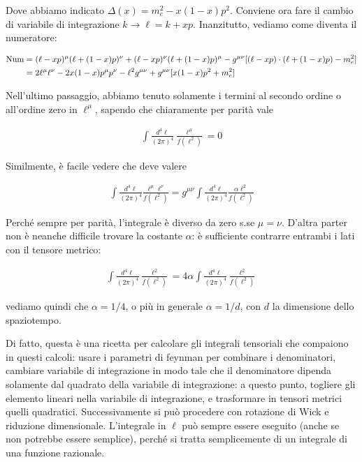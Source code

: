\documentclass[11pt]{report}
\begin{document}
Dove abbiamo indicato \(\Delta(x) = m_e^2 - x(1-x)p^2\). Conviene ora fare il cambio di variabile di integrazione \(k \to \ell = k+xp\). Inanzitutto, vediamo come diventa il numeratore: 

\begin{align}
    \text{Num} &= (\ell - xp)^\mu (\ell + (1-x)p)^\nu + (\ell - xp)^\nu (\ell + (1-x)p)^\mu -g^{\mu\nu}[(\ell-xp)\cdot(\ell + (1-x)p)-m_e^2] \notag \\
    &= 2\ell^\mu \ell^\nu - 2x(1-x)p^\mu p^\nu - \ell^2g^{\mu\nu} + g^{\mu\nu}[x(1-x)p^2 + m_e^2]
\end{align}

Nell'ultimo passaggio, abbiamo tenuto solamente i termini al secondo ordine o all'ordine zero in \(\ell^\mu\), sapendo che chiaramente per parità vale 

\begin{align}
    \int \frac{d^4\ell}{(2\pi)^4}\frac{\ell^\mu}{f(\ell^2)} = 0
\end{align}

Similmente, è facile vedere che deve valere

\begin{align}
    \int \frac{d^4\ell}{(2\pi)^4}\frac{\ell^\mu \ell^\nu}{f(\ell^2)} = g^{\mu\nu}\int \frac{d^4\ell}{(2\pi)^4}\frac{\alpha \ell^2}{f(\ell^2)}
\end{align}

Perché sempre per parità, l'integrale è diverso da zero s.se \(\mu = \nu\). D'altra parter non è neanche difficile trovare la costante \(\alpha\): è sufficiente contrarre entrambi i lati con il tensore metrico: 

\begin{align}
    \int \frac{d^4\ell}{(2\pi)^4}\frac{\ell^2}{f(\ell^2)} = 4\alpha\int \frac{d^4\ell}{(2\pi)^4}\frac{\ell^2}{f(\ell^2)} 
\end{align}

vediamo quindi che \(\alpha = 1/4\), o più in generale \(\alpha = 1/d\), con \(d\) la dimensione dello spaziotempo. 

Di fatto, questa è una ricetta per calcolare gli integrali tensoriali che compaiono in questi calcoli: usare i parametri di feynman per combinare i denominatori, cambiare variabile di integrazione in modo tale che il denominatore dipenda solamente dal quadrato della variabile di integrazione: a questo punto, togliere gli elemento lineari nella variabile di integrazione, e trasformare in tensori metrici quelli quadratici. Successivamente si può procedere con rotazione di Wick e riduzione dimensionale. L'integrale in \(\ell\) può sempre essere eseguito (anche se non potrebbe essere semplice), perché si tratta semplicemente di un integrale di una funzione razionale. 
\end{document}
